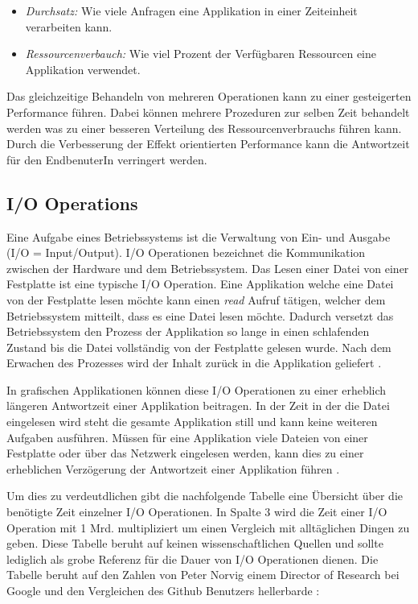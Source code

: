 \begin{itemize}
  \item \emph{Durchsatz:} Wie viele Anfragen eine Applikation in einer Zeiteinheit verarbeiten kann.
  \item \emph{Ressourcenverbauch:} Wie viel Prozent der Verfügbaren Ressourcen eine Applikation verwendet.
\end{itemize}

Das gleichzeitige Behandeln von mehreren Operationen kann zu einer gesteigerten Performance führen. Dabei können mehrere Prozeduren zur selben Zeit behandelt werden was zu einer besseren Verteilung des Ressourcenverbrauchs führen kann. Durch die Verbesserung der Effekt orientierten Performance kann die Antwortzeit für den EndbenuterIn verringert werden.

\subsection{I/O Operations}
\label{subsection: io_operationen}

Eine Aufgabe eines Betriebssystems ist die Verwaltung von Ein- und Ausgabe (I/O = Input/Output). I/O Operationen bezeichnet die Kommunikation zwischen der Hardware und dem Betriebssystem. Das Lesen einer Datei von einer Festplatte ist eine typische I/O Operation. Eine Applikation welche eine Datei von der Festplatte lesen möchte kann einen \emph{read} Aufruf tätigen, welcher dem Betriebssystem mitteilt, dass es eine Datei lesen möchte. Dadurch versetzt das Betriebssystem den Prozess der Applikation so lange in einen schlafenden Zustand bis die Datei vollständig von der Festplatte gelesen wurde. Nach dem Erwachen des Prozesses wird der Inhalt zurück in die Applikation geliefert \cite[p. 292]{tan09}.

In grafischen Applikationen können diese I/O Operationen zu einer erheblich längeren Antwortzeit einer Applikation beitragen. In der Zeit in der die Datei eingelesen wird  steht die gesamte Applikation still und kann keine weiteren Aufgaben ausführen. Müssen für eine Applikation viele Dateien von einer Festplatte oder über das Netzwerk eingelesen werden, kann dies zu einer erheblichen Verzögerung der Antwortzeit einer Applikation führen \cite[p. 307]{tan09}. 

Um dies zu verdeutdlichen gibt die nachfolgende Tabelle eine Übersicht über die benötigte Zeit einzelner I/O Operationen. In Spalte 3 wird die Zeit einer I/O Operation mit 1 Mrd. multipliziert um einen Vergleich mit alltäglichen Dingen zu geben. Diese Tabelle beruht auf keinen wissenschaftlichen Quellen und sollte lediglich als grobe Referenz für die Dauer von I/O Operationen dienen. Die Tabelle beruht auf den Zahlen von Peter Norvig \cite[]{Nor98} einem Director of Research bei Google und den Vergleichen des Github Benutzers hellerbarde \cite[]{Gis15}:

